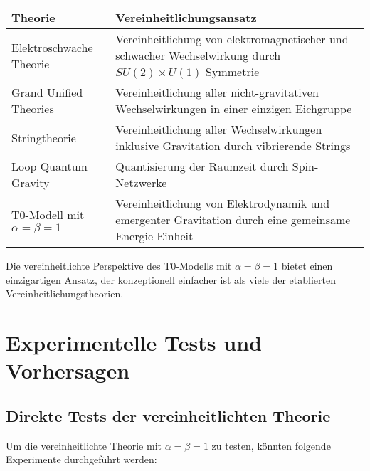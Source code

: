\documentclass[12pt,a4paper]{article}
\begin{document}
	\begin{tcolorbox}[colback=blue!5!white,colframe=blue!75!black,title=Vergleich mit anderen Vereinheitlichungstheorien]
		\begin{tabular}{>{\raggedright\arraybackslash}p{3cm}|>{\raggedright\arraybackslash}p{8cm}}
			\textbf{Theorie} & \textbf{Vereinheitlichungsansatz} \\
			\hline
			Elektroschwache Theorie & Vereinheitlichung von elektromagnetischer und schwacher Wechselwirkung durch $SU(2) \times U(1)$ Symmetrie \\
			\hline
			Grand Unified Theories & Vereinheitlichung aller nicht-gravitativen Wechselwirkungen in einer einzigen Eichgruppe \\
			\hline
			Stringtheorie & Vereinheitlichung aller Wechselwirkungen inklusive Gravitation durch vibrierende Strings \\
			\hline
			Loop Quantum Gravity & Quantisierung der Raumzeit durch Spin-Netzwerke \\
			\hline
			T0-Modell mit $\alpha = \beta = 1$ & Vereinheitlichung von Elektrodynamik und emergenter Gravitation durch eine gemeinsame Energie-Einheit \\
		\end{tabular}
	\end{tcolorbox}
	
	Die vereinheitlichte Perspektive des T0-Modells mit $\alpha = \beta = 1$ bietet einen einzigartigen Ansatz, der konzeptionell einfacher ist als viele der etablierten Vereinheitlichungstheorien.
	
	\section{Experimentelle Tests und Vorhersagen}
	
	\subsection{Direkte Tests der vereinheitlichten Theorie}
	
	Um die vereinheitlichte Theorie mit $\alpha = \beta = 1$ zu testen, könnten folgende Experimente durchgeführt werden:
	
\end{document}
